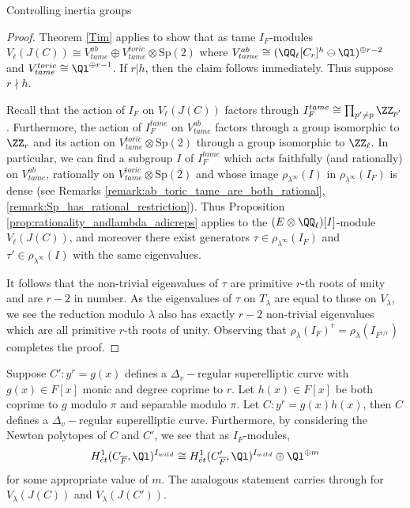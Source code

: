 \documentclass[11pt,a4paper]{article}
\newcommand{\Dv}{\Delta_v}
\begin{document}
\begin{section}{Controlling inertia groups}
\begin{proof}
Theorem \ref{Tim} applies to show that as tame $I_F$-modules $V_\ell(J(C)) \cong V^{ab}_{tame} \oplus V^{toric}_{tame} \otimes \mathrm{Sp}(2)$ where $V^{ab}_{tame} \cong (\QQ_\ell[C_{r}]^h \ominus \Ql )^{\oplus r-2}$ and $V^{toric}_{tame} \cong  \Ql ^{\oplus r-1}$.
If $r|h$, then the claim follows immediately.
Thus suppose $r \nmid h$.

Recall that the action of $I_F$ on $V_\ell(J(C))$ factors through $I_F^{tame} \cong \prod_{p' \neq p} \ZZ_{p'}$ \cite[Pg. 410]{Neukirch_cohom_of_number_fields}.
Furthermore, the action of $I_F^{tame}$ on $V^{ab}_{tame}$ factors through a group isomorphic to $\ZZ_r$ and its action on $V^{toric}_{tame}\otimes \mathrm{Sp}(2)$ through a group isomorphic to $\ZZ_\ell$.
In particular, we can find a subgroup $I$ of $I_F^{tame}$ which acts faithfully (and rationally) on $V^{ab}_{tame}$, rationally on $V^{toric}_{tame}\otimes \mathrm{Sp}(2)$ and whose image $\rho_{\lambda^\infty}(I)$ in $\rho_{\lambda^\infty}(I_F)$ is dense (see Remarks \ref{remark:ab_toric_tame_are_both_rational}, \ref{remark:Sp_has_rational_restriction}).
Thus Proposition \ref{prop:rationality_andlambda_adicreps} applies to the $(E \otimes \QQ_\ell)[I]$-module $V_\ell(J(C))$, and moreover there exist generators $\tau \in \rho_{\lambda^\infty}(I_F)$ and $\tau' \in \rho_{\lambda^\infty}(I)$ with the same eigenvalues.

It follows that the non-trivial eigenvalues of $\tau$ are primitive $r$-th roots of unity and are $r-2$ in number.
As the eigenvalues of $\tau$ on $T_\lambda$ are equal to those on  $V_\lambda$, we see the reduction modulo $\lambda$ also has exactly $r-2$ non-trivial eigenvalues which are all primitive $r$-th roots of unity.
Observing that $\rho_\lambda(I_F)^r = \rho_\lambda(I_{F^{1/r}})$ completes the proof.
\end{proof}


\begin{remark}
Suppose $C'\colon y^r = g(x)$ defines a $\Dv-$regular superelliptic curve with $g(x)\in F[x]$ monic and degree coprime to $r$. Let $h(x)\in F[x]$ be both coprime to $g$ modulo $\pi$ and separable modulo $\pi$. Let $C \colon y^r = g(x)h(x)$, then $C$ defines a $\Dv-$regular superelliptic curve.
Furthermore, by considering the Newton polytopes of $C$ and $C'$, we see that as $I_F$-modules,  \[H_{\acute{e}t}^1(C_{\overline{F}},\Ql)^{I_{wild}} \cong H_{\acute{e}t}^1(C'_{\overline{F}},\Ql)^{I_{wild}} \oplus \Ql^{\oplus m}\] for some appropriate value of $m$.
The analogous  statement carries through for $V_\lambda(J(C))$ and $V_\lambda(J(C'))$.
\end{remark}


\end{section}
\end{document}
